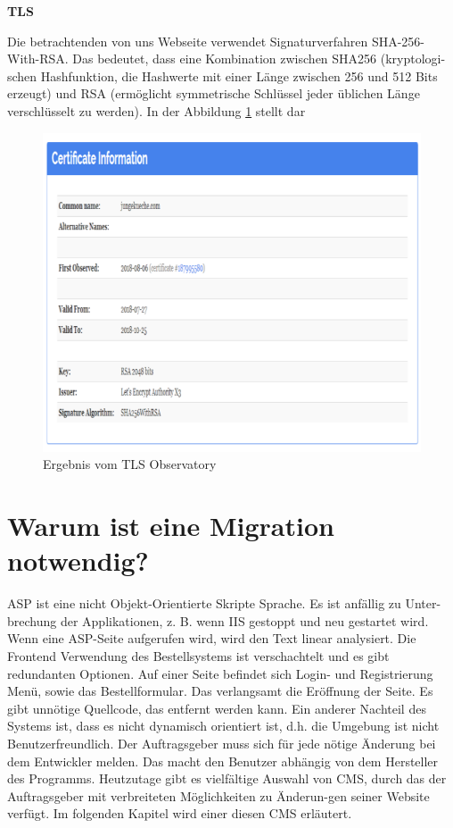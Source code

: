 \textbf{TLS}

Die betrachtenden von uns Webseite verwendet Signaturverfahren SHA-256-With-RSA. Das bedeutet, dass eine Kombination zwischen SHA256 (kryptologi-schen Hashfunktion, die Hashwerte mit einer Länge zwischen 256 und 512 Bits erzeugt) und \ac{RSA} (ermöglicht symmetrische Schlüssel jeder üblichen Länge verschlüsselt zu werden). In der Abbildung \ref{fig: TSL Observatory: Ergebnis} stellt dar

\begin{figure}[h]
	\centering
	\includegraphics[width=0.8\linewidth]{Graphics/obser2.png}
	\caption[Egebniss TSL Observatory]{Ergebnis vom TLS Observatory}
	\label{fig: TSL Observatory: Ergebnis}
\end{figure}

\section{Warum ist eine Migration notwendig?}

ASP ist eine nicht Objekt-Orientierte Skripte Sprache. Es ist anfällig zu Unter-brechung der Applikationen, z. B. wenn \ac{IIS} gestoppt und neu gestartet wird. Wenn eine ASP-Seite aufgerufen wird, wird den Text linear analysiert.
Die Frontend Verwendung des Bestellsystems ist verschachtelt und es gibt redundanten Optionen. Auf einer Seite befindet sich Login- und Registrierung Menü, sowie das Bestellformular. Das verlangsamt die Eröffnung der Seite. 
Es gibt unnötige Quellcode, das entfernt werden kann. Ein anderer Nachteil des Systems ist, dass es nicht dynamisch orientiert ist, d.h. die Umgebung ist nicht Benutzerfreundlich. Der Auftragsgeber muss sich für jede nötige Änderung bei dem Entwickler melden. Das macht den Benutzer abhängig von dem Hersteller des Programms.
Heutzutage gibt es vielfältige Auswahl von CMS, durch das der Auftragsgeber mit verbreiteten Möglichkeiten zu Änderun-gen seiner Website verfügt. 
Im folgenden Kapitel wird einer diesen CMS erläutert.





